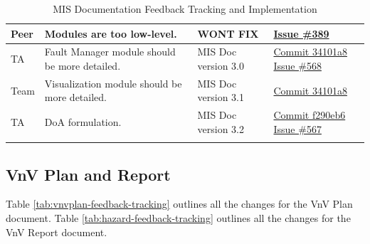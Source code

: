 \documentclass{article}
\begin{document}
\begin{longtable}{|p{2cm}|p{4.5cm}|p{3.5cm}|p{3cm}|}
    Peer &
    Modules are too low-level. &
    WONT FIX & 
    \href{https://github.com/Team6-SixSense/audio360/issues/389}{Issue \#389} \\
    \hline

    TA &
    Fault Manager module should be more detailed. &
    MIS Doc version 3.0 & 
    \href{https://github.com/Team6-SixSense/audio360/commit/34101a8}{Commit
        34101a8}
    \newline
    \href{https://github.com/Team6-SixSense/audio360/issues/568}{Issue \#568} \\
    \hline

    Team &
    Visualization module should be more detailed. &
    MIS Doc version 3.1 & 
    \href{https://github.com/Team6-SixSense/audio360/commit/34101a8}{Commit
        34101a8} \\
    \hline

    TA &
    DoA formulation. &
    MIS Doc version 3.2 & 
    \href{https://github.com/Team6-SixSense/audio360/commit/f290eb6}{Commit
        f290eb6}
    \newline
    \href{https://github.com/Team6-SixSense/audio360/issues/567}{Issue \#567} \\
    \hline

    \caption{MIS Documentation Feedback Tracking and Implementation}
\end{longtable}

\subsection{VnV Plan and Report}

Table \ref{tab:vnvplan-feedback-tracking} outlines all the changes for the VnV
Plan document.
Table \ref{tab:hazard-feedback-tracking} outlines all the changes for the VnV
Report document.
\end{document}
